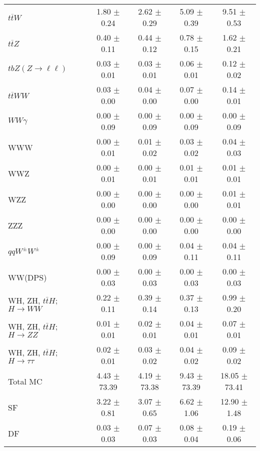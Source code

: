 \begin{tabular}{l|cccc}
                   $t\overline{t}W$ &  1.80 $\pm$  0.24 &  2.62 $\pm$  0.29 &  5.09 $\pm$  0.39 &  9.51 $\pm$  0.53 \\
                   $t\overline{t}Z$ &  0.40 $\pm$  0.11 &  0.44 $\pm$  0.12 &  0.78 $\pm$  0.15 &  1.62 $\pm$  0.21 \\
    $tbZ (Z \rightarrow \ell \ell)$ &  0.03 $\pm$  0.01 &  0.03 $\pm$  0.01 &  0.06 $\pm$  0.01 &  0.12 $\pm$  0.02 \\
                  $t\overline{t}WW$ &  0.03 $\pm$  0.00 &  0.04 $\pm$  0.00 &  0.07 $\pm$  0.00 &  0.14 $\pm$  0.01 \\
                         $WW\gamma$ &  0.00 $\pm$  0.09 &  0.00 $\pm$  0.09 &  0.00 $\pm$  0.09 &  0.00 $\pm$  0.09 \\
                                WWW &  0.00 $\pm$  0.01 &  0.01 $\pm$  0.02 &  0.03 $\pm$  0.02 &  0.04 $\pm$  0.03 \\
                                WWZ &  0.00 $\pm$  0.01 &  0.00 $\pm$  0.01 &  0.01 $\pm$  0.01 &  0.01 $\pm$  0.01 \\
                                WZZ &  0.00 $\pm$  0.00 &  0.00 $\pm$  0.00 &  0.00 $\pm$  0.00 &  0.01 $\pm$  0.01 \\
                                ZZZ &  0.00 $\pm$  0.00 &  0.00 $\pm$  0.00 &  0.00 $\pm$  0.00 &  0.00 $\pm$  0.00 \\
                 $qqW^{\pm}W^{\pm}$ &  0.00 $\pm$  0.09 &  0.00 $\pm$  0.09 &  0.04 $\pm$  0.11 &  0.04 $\pm$  0.11 \\
                            WW(DPS) &  0.00 $\pm$  0.03 &  0.00 $\pm$  0.03 &  0.00 $\pm$  0.03 &  0.00 $\pm$  0.03 \\
WH, ZH, $t\bar{t}H$; $H \rightarrow WW$ &  0.22 $\pm$  0.11 &  0.39 $\pm$  0.14 &  0.37 $\pm$  0.13 &  0.99 $\pm$  0.20 \\
WH, ZH, $t\bar{t}H$; $H \rightarrow ZZ$ &  0.01 $\pm$  0.01 &  0.02 $\pm$  0.01 &  0.04 $\pm$  0.01 &  0.07 $\pm$  0.01 \\
WH, ZH, $t\bar{t}H$; $H \rightarrow \tau\tau$ &  0.02 $\pm$  0.01 &  0.03 $\pm$  0.02 &  0.04 $\pm$  0.02 &  0.09 $\pm$  0.02 \\
\hline\hline
                           Total MC &  4.43 $\pm$ 73.39 &  4.19 $\pm$ 73.38 &  9.43 $\pm$ 73.39 & 18.05 $\pm$ 73.41 \\
\hline
                                 SF &  3.22 $\pm$  0.81 &  3.07 $\pm$  0.65 &  6.62 $\pm$  1.06 & 12.90 $\pm$  1.48 \\
                                 DF &  0.03 $\pm$  0.03 &  0.07 $\pm$  0.03 &  0.08 $\pm$  0.04 &  0.19 $\pm$  0.06 \\

\end{tabular}
